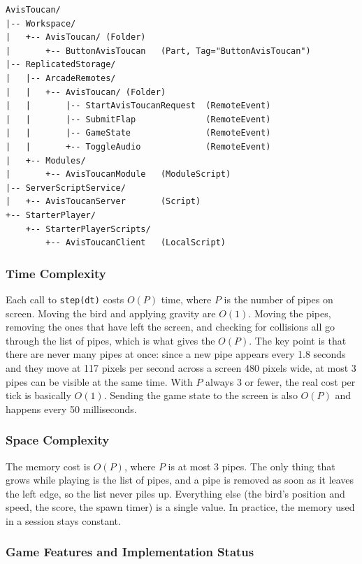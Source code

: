 \documentclass[12pt,letterpaper]{article}
\begin{document}
\begin{lstlisting}
AvisToucan/
|-- Workspace/
|   +-- AvisToucan/ (Folder)
|       +-- ButtonAvisToucan   (Part, Tag="ButtonAvisToucan")
|-- ReplicatedStorage/
|   |-- ArcadeRemotes/
|   |   +-- AvisToucan/ (Folder)
|   |       |-- StartAvisToucanRequest  (RemoteEvent)
|   |       |-- SubmitFlap              (RemoteEvent)
|   |       |-- GameState               (RemoteEvent)
|   |       +-- ToggleAudio             (RemoteEvent)
|   +-- Modules/
|       +-- AvisToucanModule   (ModuleScript)
|-- ServerScriptService/
|   +-- AvisToucanServer       (Script)
+-- StarterPlayer/
    +-- StarterPlayerScripts/
        +-- AvisToucanClient   (LocalScript)
\end{lstlisting}


\subsubsection{Time Complexity}

Each call to \texttt{step(dt)} costs $O(P)$ time, where $P$ is the number of pipes on screen. Moving the bird and applying gravity are $O(1)$. Moving the pipes, removing the ones that have left the screen, and checking for collisions all go through the list of pipes, which is what gives the $O(P)$. The key point is that there are never many pipes at once: since a new pipe appears every 1.8 seconds and they move at 117 pixels per second across a screen 480 pixels wide, at most 3 pipes can be visible at the same time. With $P$ always 3 or fewer, the real cost per tick is basically $O(1)$. Sending the game state to the screen is also $O(P)$ and happens every 50 milliseconds.

\subsubsection{Space Complexity}

The memory cost is $O(P)$, where $P$ is at most 3 pipes. The only thing that grows while playing is the list of pipes, and a pipe is removed as soon as it leaves the left edge, so the list never piles up. Everything else (the bird's position and speed, the score, the spawn timer) is a single value. In practice, the memory used in a session stays constant.

\subsubsection{Game Features and Implementation Status}
\end{document}
